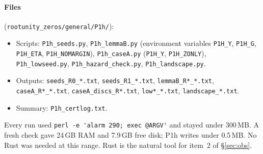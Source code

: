 \documentclass[11pt]{article}
\theoremstyle{remark}\newtheorem{remark}[theorem]{Remark}
\begin{document}
\paragraph{Files} (\texttt{rootunity\_zeros/general/P1h/}):
\begin{itemize}
\item Scripts: \texttt{P1h\_seeds.py}, \texttt{P1h\_lemmaB.py} (environment variables \texttt{P1H\_Y}, \texttt{P1H\_G}, \texttt{P1H\_ETA}, \texttt{P1H\_NOMARGIN}), \texttt{P1h\_caseA.py} (\texttt{P1H\_Y}, \texttt{P1H\_ZONLY}), \texttt{P1h\_lowseed.py}, \texttt{P1h\_hazard\_check.py}, \texttt{P1h\_landscape.py}.
\item Outputs: \texttt{seeds\_R0\_*.txt}, \texttt{seeds\_R1\_*.txt}, \texttt{lemmaB\_R*\_*.txt}, \texttt{caseA\_R*\_*.txt}, \texttt{caseA\_discs\_R*.txt}, \texttt{low*\_*.txt}, \texttt{landscape\_*.txt}.
\item Summary: \texttt{P1h\_certlog.txt}.
\end{itemize}
Every run used \verb|perl -e 'alarm 290; exec @ARGV'| and stayed under 300\,MB. A fresh check gave 24\,GB RAM and 7.9\,GB free disk; P1h writes under 0.5\,MB. No Rust was needed at this range. Rust is the natural tool for item~2 of \S\ref{sec:obs}.
\end{document}
